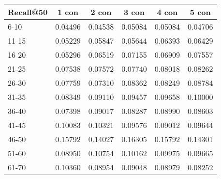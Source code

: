 \begin{table}[]
    \begin{tabular}{|l|l|l|l|l|l|}
    \hline
    Recall@50 & \multicolumn{1}{c|}{1 con} & \multicolumn{1}{c|}{2 con} & \multicolumn{1}{c|}{3 con} & \multicolumn{1}{c|}{4 con} & \multicolumn{1}{c|}{5 con} \\ \hline
    6-10      & 0.04496                    & 0.04538                    & 0.05084                    & 0.05084                    & 0.04706                    \\ \hline
    11-15     & 0.05229                    & 0.05847                    & 0.05644                    & 0.06393                    & 0.06429                    \\ \hline
    16-20     & 0.05296                    & 0.06519                    & 0.07155                    & 0.06909                    & 0.07557                    \\ \hline
    21-25     & 0.07538                    & 0.07572                    & 0.07740                    & 0.08018                    & 0.08262                    \\ \hline
    26-30     & 0.07759                    & 0.07310                    & 0.08362                    & 0.08249                    & 0.08784                    \\ \hline
    31-35     & 0.08349                    & 0.09110                    & 0.09457                    & 0.09658                    & 0.10000                    \\ \hline
    36-40     & 0.07398                    & 0.09017                    & 0.08287                    & 0.08990                    & 0.08603                    \\ \hline
    41-45     & 0.10083                    & 0.10321                    & 0.09576                    & 0.09012                    & 0.09644                    \\ \hline
    46-50     & 0.15792                    & 0.14027                    & 0.16305                    & 0.15792                    & 0.14301                    \\ \hline
    51-60     & 0.08950                    & 0.10754                    & 0.10162                    & 0.09975                    & 0.09665                    \\ \hline
    61-70     & 0.10360                    & 0.08954                    & 0.09048                    & 0.08979                    & 0.08252                    \\ \hline

\end{tabular}
\end{table}
